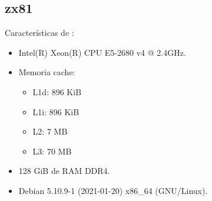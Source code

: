 \documentclass[a4paper,spanish,12pt,twoside]{article}
\begin{document}
\clearpage
\pagebreak

\begin{appendices}
	\section{zx81}\label{app:zx81}
	Características de :
	\begin{itemize}
		\item Intel(R) Xeon(R) CPU E5-2680 v4 @ 2.4GHz.
		\item Memoria cache:
		\begin{itemize}
			\item L1d: 896 KiB
			\item L1i: 896 KiB
			\item L2: 7 MB
			\item L3: 70 MB
		\end{itemize}
		\item 128 GiB de RAM DDR4.
		\item Debian 5.10.9-1 (2021-01-20) x86\_64 (GNU/Linux).
	\end{itemize}
\end{appendices}
\end{document}
